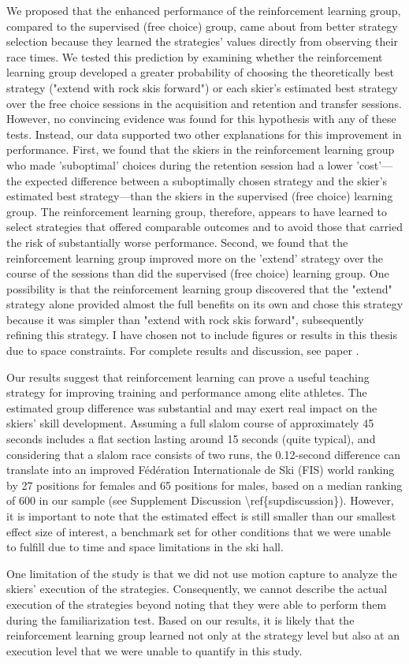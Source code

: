 We proposed that the enhanced performance of the reinforcement learning group, compared to the supervised (free choice) group, came about from better strategy selection because they learned the strategies' values directly from observing their race times. We tested this prediction by examining whether the reinforcement learning group developed a greater probability of choosing the theoretically best strategy ("extend with rock skis forward") or each skier's estimated best strategy over the free choice sessions in the acquisition and retention and transfer sessions. However, no convincing evidence was found for this hypothesis with any of these tests. Instead, our data supported two other explanations for this improvement in performance. First, we found that the skiers in the reinforcement learning group who made 'suboptimal' choices during the retention session had a lower 'cost'—the expected difference between a suboptimally chosen strategy and the skier's estimated best strategy—than the skiers in the supervised (free choice) learning group. The reinforcement learning group, therefore, appears to have learned to select strategies that offered comparable outcomes and to avoid those that carried the risk of substantially worse performance. Second, we found that the reinforcement learning group improved more on the 'extend' strategy over the course of the sessions than did the supervised (free choice) learning group. One possibility is that the reinforcement learning group discovered that the "extend" strategy alone provided almost the full benefits on its own and chose this strategy because it was simpler than "extend with rock skis forward", subsequently refining this strategy. I have chosen not to include figures or results in this thesis due to space constraints. For complete results and discussion, see paper .

Our results suggest that reinforcement learning can prove a useful teaching strategy for improving training and performance among elite athletes. The estimated group difference was substantial and may exert real impact on the skiers' skill development. Assuming a full slalom course of approximately 45 seconds includes a flat section lasting around 15 seconds (quite typical), and considering that a slalom race consists of two runs, the 0.12-second difference can translate into an improved Fédération Internationale de Ski (FIS) world ranking by 27 positions for females and 65 positions for males, based on a median ranking of 600 in our sample (see Supplement Discussion \textbackslash{}ref\{supdiscussion\}). However, it is important to note that the estimated effect is still smaller than our smallest effect size of interest, a benchmark set for other conditions that we were unable to fulfill due to time and space limitations in the ski hall. 

One limitation of the study is that we did not use motion capture to analyze the skiers' execution of the strategies. Consequently, we cannot describe the actual execution of the strategies beyond noting that they were able to perform them during the familiarization test. Based on our results, it is likely that the reinforcement learning group learned not only at the strategy level but also at an execution level that we were unable to quantify in this study. 
